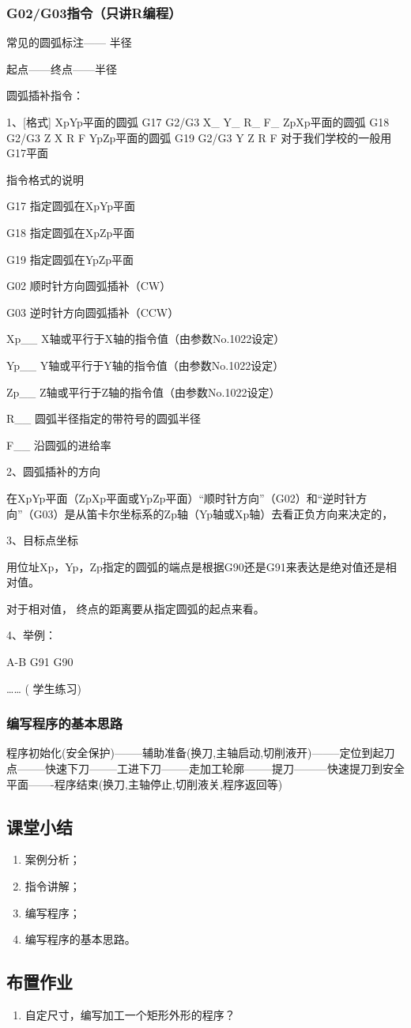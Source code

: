 \subsubsection{G02/G03指令（只讲R编程）}

常见的圆弧标注—— 半径

起点——终点——半径

圆弧插补指令：

1、[格式]
XpYp平面的圆弧   
G17  G2/G3  X\_ Y\_ R\_ F\_
ZpXp平面的圆弧   
G18 G2/G3 Z X R F 
YpZp平面的圆弧   
G19 G2/G3 Y Z R F
对于我们学校的一般用G17平面

指令格式的说明

G17	指定圆弧在XpYp平面

G18	指定圆弧在XpZp平面

G19	指定圆弧在YpZp平面

G02	顺时针方向圆弧插补（CW）

G03	逆时针方向圆弧插补（CCW）

Xp\_\_	X轴或平行于X轴的指令值（由参数No.1022设定）

Yp\_\_	Y轴或平行于Y轴的指令值（由参数No.1022设定）

Zp\_\_	Z轴或平行于Z轴的指令值（由参数No.1022设定）

R\_\_	圆弧半径指定的带符号的圆弧半径

F\_\_	沿圆弧的进给率 



2、圆弧插补的方向

在XpYp平面（ZpXp平面或YpZp平面）“顺时针方向”（G02）和“逆时针方向”（G03）是从笛卡尔坐标系的Zp轴（Yp轴或Xp轴）去看正负方向来决定的，

3、目标点坐标

用位址Xp，Yp，Zp指定的圆弧的端点是根据G90还是G91来表达是绝对值还是相对值。

对于相对值， 终点的距离要从指定圆弧的起点来看。

4、举例：

A-B   G91   G90 

……   ( 学生练习)




\subsubsection{编写程序的基本思路}
程序初始化(安全保护)--------辅助准备(换刀,主轴启动,切削液开)--------定位到起刀点--------快速下刀--------工进下刀--------走加工轮廓--------提刀---------快速提刀到安全平面-------程序结束(换刀,主轴停止,切削液关,程序返回等)
\subsection{课堂小结}
\begin{enumerate}[1、]
\item 案例分析；
\item 指令讲解；
\item 编写程序；
\item 编写程序的基本思路。
\end{enumerate}
\vfill
\subsection{布置作业}
\begin{enumerate}[1、]
	\item 自定尺寸，编写加工一个矩形外形的程序？
\end{enumerate}
\vfill